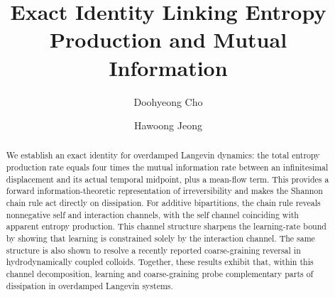 \documentclass[
 longbibliography,
 twocolumn,
 superscriptaddress,
 amsmath,
 amssymb,
 amsthm,
 amsfonts,
 prl,
 floatfix,
]{revtex4-2}
\begin{document}
\title{Exact Identity Linking Entropy Production and Mutual Information}

\author{Doohyeong Cho}

\author{Hawoong Jeong}


\begin{abstract}
We establish an exact identity for overdamped Langevin dynamics: the total entropy production rate equals four times the mutual information rate between an infinitesimal displacement and its actual temporal midpoint, plus a mean-flow term. This provides a forward information-theoretic representation of irreversibility and makes the Shannon chain rule act directly on dissipation. For additive bipartitions, the chain rule reveals nonnegative self and interaction channels, with the self channel coinciding with apparent entropy production.
This channel structure sharpens the learning-rate bound by showing that learning is constrained solely by the interaction channel. The same structure is also shown to resolve a recently reported coarse-graining reversal in hydrodynamically coupled colloids. Together, these results exhibit that, within this channel decomposition, learning and coarse-graining probe complementary parts of dissipation in overdamped Langevin systems.

\end{abstract}

\maketitle
\end{document}
